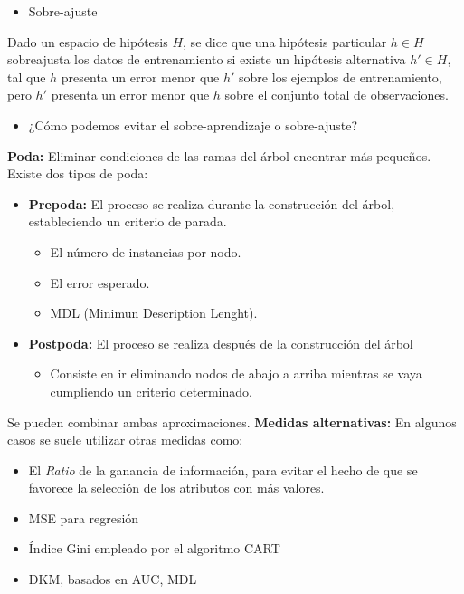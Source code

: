 \begin{itemize}[label=\color{red}\textbullet, leftmargin=*]
	\item \color{lightblue}Sobre-ajuste
\end{itemize}
Dado un espacio de hipótesis $H$, se dice que una hipótesis particular $h\in H$ sobreajusta los datos de entrenamiento si existe un hipótesis alternativa $h'\in H$, tal que $h$ presenta un error menor que $h'$ sobre los ejemplos de entrenamiento, pero $h'$ presenta un error menor que $h$ sobre el conjunto total de observaciones.
\begin{itemize}[label=\color{red}\textbullet, leftmargin=*]
	\item \color{lightblue}¿Cómo podemos evitar el sobre-aprendizaje o sobre-ajuste?
\end{itemize}
\textbf{Poda:} Eliminar condiciones de las ramas del árbol encontrar más pequeños. Existe dos tipos de poda:\begin{itemize}
	\item \textbf{Prepoda:} El proceso se realiza durante la construcción del árbol, estableciendo un criterio de parada.
	\begin{itemize}
		\item El número de instancias por nodo.
		\item El error esperado.
		\item MDL (Minimun Description Lenght).
	\end{itemize}
	\item \textbf{Postpoda:} El proceso se realiza después de la construcción del árbol
	\begin{itemize}
		\item Consiste en ir eliminando nodos de abajo a arriba mientras se vaya cumpliendo un criterio determinado.
	\end{itemize}
\end{itemize}
Se pueden combinar ambas aproximaciones.
\textbf{Medidas alternativas:} En algunos casos se suele utilizar otras medidas como:
\begin{itemize}
	\item El \textit{Ratio} de la ganancia de información, para evitar el hecho de que se favorece la selección de los atributos con más valores.
	\item MSE para regresión
	\item Índice Gini empleado por el algoritmo CART
	\item DKM, basados en AUC, MDL
\end{itemize}
